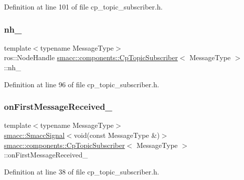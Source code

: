 Definition at line 101 of file cp\+\_\+topic\+\_\+subscriber.\+h.

\mbox{\label{classsmacc_1_1components_1_1CpTopicSubscriber_aee3369aec5cf88918bf1e812b3d68dd6}} 
\subsubsection{\texorpdfstring{nh\+\_\+}{nh\_}}
{\footnotesize\ttfamily template$<$typename Message\+Type$>$ \\
ros\+::\+Node\+Handle \hyperlink{classsmacc_1_1components_1_1CpTopicSubscriber}{smacc\+::components\+::\+Cp\+Topic\+Subscriber}$<$ Message\+Type $>$\+::nh\+\_\+\hspace{0.3cm}{\ttfamily [protected]}}



Definition at line 96 of file cp\+\_\+topic\+\_\+subscriber.\+h.

\mbox{\label{classsmacc_1_1components_1_1CpTopicSubscriber_ab8e319857951489298faefa4882e49cc}} 
\subsubsection{\texorpdfstring{on\+First\+Message\+Received\+\_\+}{onFirstMessageReceived\_}}
{\footnotesize\ttfamily template$<$typename Message\+Type$>$ \\
\hyperlink{classsmacc_1_1SmaccSignal}{smacc\+::\+Smacc\+Signal}$<$void(const Message\+Type \&)$>$ \hyperlink{classsmacc_1_1components_1_1CpTopicSubscriber}{smacc\+::components\+::\+Cp\+Topic\+Subscriber}$<$ Message\+Type $>$\+::on\+First\+Message\+Received\+\_\+}



Definition at line 38 of file cp\+\_\+topic\+\_\+subscriber.\+h.

